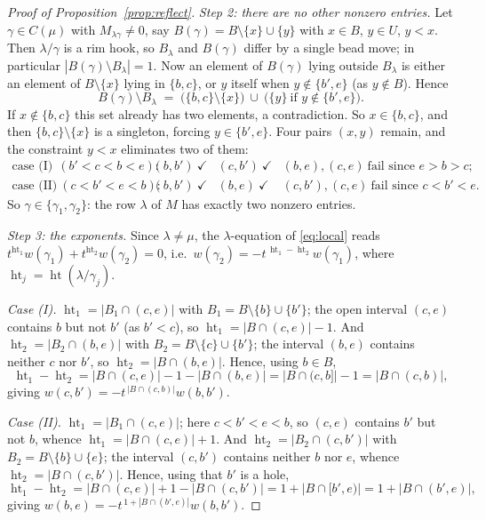 \documentclass[11pt]{article}
\theoremstyle{definition}
\newcommand{\hgt}{\operatorname{ht}}
\begin{document}
\begin{proof}[Proof of Proposition~\ref{prop:reflect}]
\smallskip\noindent\emph{Step 2: there are no other nonzero entries.}
Let $\gamma\in C(\mu)$ with $M_{\lambda\gamma}\ne0$, say $B(\gamma)=B\setminus\{x\}\cup\{y\}$
with $x\in B$, $y\in U$, $y<x$. Then $\lambda/\gamma$ is a rim hook, so $B_\lambda$ and
$B(\gamma)$ differ by a single bead move; in particular
$|B(\gamma)\setminus B_\lambda|=1$. Now an element of $B(\gamma)$ lying outside $B_\lambda$ is
either an element of $B\setminus\{x\}$ lying in $\{b,c\}$, or $y$ itself when
$y\notin\{b',e\}$ (as $y\notin B$). Hence
\[
   B(\gamma)\setminus B_\lambda \;=\; \bigl(\{b,c\}\setminus\{x\}\bigr)\ \cup\
   \bigl(\{y\}\ \text{if } y\notin\{b',e\}\bigr).
\]
If $x\notin\{b,c\}$ this set already has two elements, a contradiction. So $x\in\{b,c\}$, and
then $\{b,c\}\setminus\{x\}$ is a singleton, forcing $y\in\{b',e\}$. Four pairs $(x,y)$ remain,
and the constraint $y<x$ eliminates two of them:
\[
\begin{array}{llll}
\text{case (I)}\ \ (b'<c<b<e): & (b,b')\ \checkmark & (c,b')\ \checkmark &
   (b,e),(c,e)\ \text{fail since } e>b>c;\\[2pt]
\text{case (II)}\ (c<b'<e<b): & (b,b')\ \checkmark & (b,e)\ \checkmark &
   (c,b'),(c,e)\ \text{fail since } c<b'<e.
\end{array}
\]
So $\gamma\in\{\gamma_1,\gamma_2\}$: the row $\lambda$ of $M$ has exactly two nonzero entries.

\smallskip\noindent\emph{Step 3: the exponents.}
Since $\lambda\ne\mu$, the $\lambda$-equation of \eqref{eq:local} reads
$t^{\hgt_1}w(\gamma_1)+t^{\hgt_2}w(\gamma_2)=0$, i.e.\
$w(\gamma_2)=-t^{\,\hgt_1-\hgt_2}w(\gamma_1)$, where $\hgt_j=\hgt(\lambda/\gamma_j)$.

\emph{Case (I).} $\hgt_1=|B_1\cap(c,e)|$ with $B_1=B\setminus\{b\}\cup\{b'\}$; the open
interval $(c,e)$ contains $b$ but not $b'$ (as $b'<c$), so $\hgt_1=|B\cap(c,e)|-1$. And
$\hgt_2=|B_2\cap(b,e)|$ with $B_2=B\setminus\{c\}\cup\{b'\}$; the interval $(b,e)$ contains
neither $c$ nor $b'$, so $\hgt_2=|B\cap(b,e)|$. Hence, using $b\in B$,
\[
   \hgt_1-\hgt_2=|B\cap(c,e)|-1-|B\cap(b,e)|=|B\cap(c,b]|-1=|B\cap(c,b)| ,
\]
giving $w(c,b')=-t^{\,|B\cap(c,b)|}w(b,b')$.

\emph{Case (II).} $\hgt_1=|B_1\cap(c,e)|$; here $c<b'<e<b$, so $(c,e)$ contains $b'$ but not
$b$, whence $\hgt_1=|B\cap(c,e)|+1$. And $\hgt_2=|B_2\cap(c,b')|$ with
$B_2=B\setminus\{b\}\cup\{e\}$; the interval $(c,b')$ contains neither $b$ nor $e$, whence
$\hgt_2=|B\cap(c,b')|$. Hence, using that $b'$ is a hole,
\[
   \hgt_1-\hgt_2=|B\cap(c,e)|+1-|B\cap(c,b')|=1+|B\cap[b',e)|=1+|B\cap(b',e)| ,
\]
giving $w(b,e)=-t^{\,1+|B\cap(b',e)|}w(b,b')$. \qedhere
\end{proof}
\end{document}
